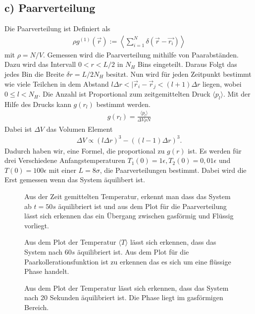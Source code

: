 \subsection*{c) Paarverteilung}
Die Paarverteilung ist Definiert als
\begin{align*}
	\rho g^{(1)}(\vec{r}):=\left< \sum\limits_{i=1}^{N}\delta(\vec{r}-\vec{r_i})\right>
\end{align*}
mit $\rho=N/V$.
Gemessen wird die Paarverteilung mithilfe von Paarabständen.
Dazu wird das Intervall $0<r<L/2$ in $N_H$ Bins eingeteilt.
Daraus Folgt das jedes Bin die Breite $\delta r= L/2N_H$ besitzt.
Nun wird für jeden Zeitpunkt bestimmt wie viele Teilchen in dem Abstand $l\Delta r < |\vec{r}_i-\vec{r}_j<(l+1)\Delta r$ liegen, wobei $0\le l < N_H$.
Die Anzahl ist Proportional zum zeitgemittelten Druck $\langle p_l \rangle$.
Mit der Hilfe des Drucks kann $g(r_l)$ bestimmt werden.
\begin{align}
	g(r_l)=\frac{\langle p_l\rangle}{\Delta V\rho N}
\end{align}
Dabei ist $\Delta V$ das Volumen Element
\begin{align*}
	\Delta V \propto (l\Delta r)^3-((l-1)\Delta r)^3.
\end{align*}
Dadurch haben wir, eine Formel, die proportional zu $g(r)$ ist.
Es werden für drei Verschiedene Anfangstemperaturen $T_1(0)=1\epsilon,T_2(0)=0,01\epsilon$ und $T(0)=100\epsilon$ mit einer $L=8\sigma$, die Paarverteilungen bestimmt.
Dabei wird die Erst gemessen wenn das System äquilibert ist.
\begin{figure}[h!]
	\centering
	\caption{Aus der Zeit gemittelten Temperatur, erkennt man dass das System ab $t=50s$ äquilibriert ist und aus dem Plot für die Paarverteilung lässt sich erkennen das ein Übergang zwischen gasförmig und Flüssig vorliegt.}
\end{figure}
\begin{figure}[h!]
	\centering
	\caption{Aus dem Plot der Temperatur $\langle T\rangle$ lässt sich erkennen, dass das System nach $60s$ äquilibriert ist. Aus dem Plot für die Paarkollerationsfunktion ist zu erkennen das es sich um eine flüssige Phase handelt.}
\end{figure}
\begin{figure}[h!]
	\centering
	\caption{Aus dem Plot der Temperatur lässt sich erkennen, dass das System nach 20 Sekunden äquilibriert ist. Die Phase liegt im gasförmigen Bereich.}
\end{figure}\newpage
